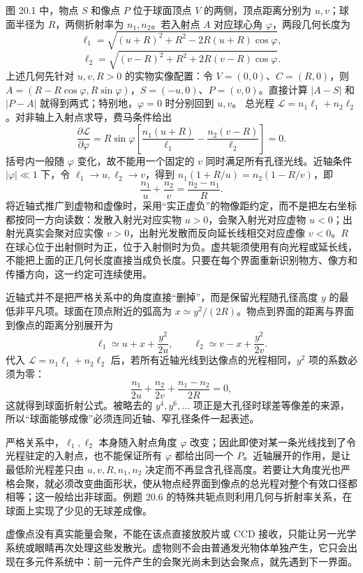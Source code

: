 图 20.1 中，物点 $S$ 和像点 $P$ 位于球面顶点 $V$ 的两侧，顶点距离分别为 $u,v$；球面半径为 $R$，两侧折射率为 $n_1,n_2$。若入射点 $A$ 对应球心角 $\varphi$，两段几何长度为
\[
 \ell_1=\sqrt{(u+R)^2+R^2-2R(u+R)\cos\varphi},
\]
\[
 \ell_2=\sqrt{(v-R)^2+R^2+2R(v-R)\cos\varphi}.
\]
上述几何先针对 $u,v,R>0$ 的实物实像配置：令 $V=(0,0)$、$C=(R,0)$，则 $A=(R-R\cos\varphi,R\sin\varphi)$，$S=(-u,0)$、$P=(v,0)$。直接计算 $|A-S|$ 和 $|P-A|$ 就得到两式；特别地，$\varphi=0$ 时分别回到 $u,v$。
总光程 $\mathcal L=n_1\ell_1+n_2\ell_2$。对非轴上入射点求导，费马条件给出
\[
 \frac{\partial\mathcal L}{\partial\varphi}
 =R\sin\varphi\left[\frac{n_1(u+R)}{\ell_1}-\frac{n_2(v-R)}{\ell_2}\right]=0.
\]
括号内一般随 $\varphi$ 变化，故不能用一个固定的 $v$ 同时满足所有孔径光线。近轴条件 $|\varphi|\ll1$ 下，令 $\ell_1\to u,\ell_2\to v$，得到
$n_1(1+R/u)=n_2(1-R/v)$，即
\begin{equation}
 \frac{n_1}{u}+\frac{n_2}{v}=\frac{n_2-n_1}{R}.
\end{equation}
将近轴式推广到虚物和虚像时，采用“实正虚负”的物像距约定，而不是把左右坐标都按同一方向读数：发散入射光对应实物 $u>0$，会聚入射光对应虚物 $u<0$；出射光真实会聚对应实像 $v>0$，出射光发散而反向延长线相交对应虚像 $v<0$。$R$ 在球心位于出射侧时为正，位于入射侧时为负。虚共轭须使用有向光程或延长线，不能把上面的正几何长度直接当成负长度。只要在每个界面重新识别物方、像方和传播方向，这一约定可连续使用。

近轴式并不是把严格关系中的角度直接“删掉”，而是保留光程随孔径高度 $y$ 的最低非平凡项。球面在顶点附近的弧高为 $x\simeq y^2/(2R)$。物点到界面的距离与界面到像点的距离分别展开为
\[
 \ell_1\simeq u+x+\frac{y^2}{2u},\qquad
 \ell_2\simeq v-x+\frac{y^2}{2v}.
\]
代入 $\mathcal L=n_1\ell_1+n_2\ell_2$ 后，若所有近轴光线到达像点的光程相同，$y^2$ 项的系数必须为零：
\[
 \frac{n_1}{2u}+\frac{n_2}{2v}+\frac{n_1-n_2}{2R}=0,
\]
这就得到球面折射公式。被略去的 $y^4,y^6,\ldots$ 项正是大孔径时球差等像差的来源，所以“球面能够成像”必须连同近轴、窄孔径条件一起表述。

严格关系中，$\ell_1,\ell_2$ 本身随入射点角度 $\varphi$ 改变；因此即使对某一条光线找到了令光程驻定的入射点，也不能保证所有 $\varphi$ 都给出同一个 $P$。近轴展开的作用，是让最低阶光程差只由 $u,v,R,n_1,n_2$ 决定而不再显含孔径高度。若要让大角度光也严格会聚，就必须改变曲面形状，使从物点经界面到像点的总光程对整个有效口径都相等；这一般给出非球面。例题 20.6 的特殊共轭点则利用几何与折射率关系，在球面上实现了少见的无球差成像。

\SphereRefractionPanel
\VirtualSignPanel

虚像点没有真实能量会聚，不能在该点直接放胶片或 CCD 接收，只能让另一光学系统或眼睛再次处理这些发散光。虚物则不会由普通发光物体单独产生，它只会出现在多元件系统中：前一元件产生的会聚光尚未到达会聚点，就先遇到下一界面。

